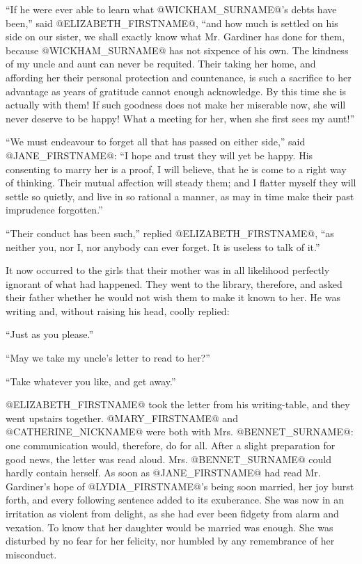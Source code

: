 ``If he were ever able to learn what @WICKHAM_SURNAME@'s debts have been,'' said
@ELIZABETH_FIRSTNAME@, ``and how much is settled on his side on our sister, we shall
exactly know what Mr. Gardiner has done for them, because @WICKHAM_SURNAME@ has
not sixpence of his own. The kindness of my uncle and aunt can never
be requited. Their taking her home, and affording her their personal
protection and countenance, is such a sacrifice to her advantage as
years of gratitude cannot enough acknowledge. By this time she is
actually with them! If such goodness does not make her miserable now,
she will never deserve to be happy! What a meeting for her, when she
first sees my aunt!''

``We must endeavour to forget all that has passed on either side,'' said
@JANE_FIRSTNAME@: ``I hope and trust they will yet be happy. His consenting to
marry her is a proof, I will believe, that he is come to a right way of
thinking. Their mutual affection will steady them; and I flatter myself
they will settle so quietly, and live in so rational a manner, as may in
time make their past imprudence forgotten.''

``Their conduct has been such,'' replied @ELIZABETH_FIRSTNAME@, ``as neither you, nor
I, nor anybody can ever forget. It is useless to talk of it.''

It now occurred to the girls that their mother was in all likelihood
perfectly ignorant of what had happened. They went to the library,
therefore, and asked their father whether he would not wish them to make
it known to her. He was writing and, without raising his head, coolly
replied:

``Just as you please.''

``May we take my uncle's letter to read to her?''

``Take whatever you like, and get away.''

@ELIZABETH_FIRSTNAME@ took the letter from his writing-table, and they went upstairs
together. @MARY_FIRSTNAME@ and @CATHERINE_NICKNAME@ were both with Mrs. @BENNET_SURNAME@: one communication
would, therefore, do for all. After a slight preparation for good news,
the letter was read aloud. Mrs. @BENNET_SURNAME@ could hardly contain herself. As
soon as @JANE_FIRSTNAME@ had read Mr. Gardiner's hope of @LYDIA_FIRSTNAME@'s being soon
married, her joy burst forth, and every following sentence added to its
exuberance. She was now in an irritation as violent from delight, as she
had ever been fidgety from alarm and vexation. To know that her daughter
would be married was enough. She was disturbed by no fear for her
felicity, nor humbled by any remembrance of her misconduct.

